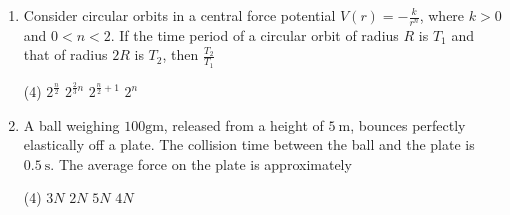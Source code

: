 \begin{enumerate}
	\item Consider circular orbits in a central force potential $V(r)=-\frac{k}{r^{n}}$, where $k>0$ and $0<n<2$. If the time period of a circular orbit of radius $R$ is $T_{1}$ and that of radius $2 R$ is $T_{2}$, then $\frac{T_{2}}{T_{1}}$
	{}
\begin{tasks}(4)
	\task[\textbf{A.}] $2^{\frac{n}{2}}$
	\task[\textbf{B.}]$2^{\frac{2}{3} n}$
	\task[\textbf{C.}]$2^{\frac{n}{2}+1}$
	\task[\textbf{D.}]$2^{n}$
\end{tasks}
	\item A ball weighing $100 \mathrm{gm}$, released from a height of $5 \mathrm{~m}$, bounces perfectly elastically off a plate. The collision time between the ball and the plate is $0.5 \mathrm{~s}$. The average force on the plate is approximately
	{}
\begin{tasks}(4)
	\task[\textbf{A.}] $3 N$
	\task[\textbf{B.}]$2 N$
	\task[\textbf{C.}]$5 N$
	\task[\textbf{D.}]$4 N$
\end{tasks}


\end{enumerate}
